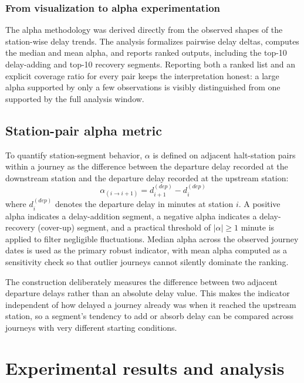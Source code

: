 \documentclass[a4paper,fleqn]{cas-dc}
\begin{document}
\subsubsection{From visualization to alpha experimentation}
The alpha methodology was derived directly from the observed shapes of the
station-wise delay trends. The analysis formalizes pairwise delay deltas,
computes the median and mean alpha, and reports ranked outputs, including the
top-10 delay-adding and top-10 recovery segments. Reporting both a ranked list
and an explicit coverage ratio for every pair keeps the interpretation
honest: a large alpha supported by only a few observations is visibly
distinguished from one supported by the full analysis window.

\subsection{Station-pair alpha metric}
To quantify station-segment behavior, $\alpha$ is defined on adjacent
halt-station pairs within a journey as the difference between the departure
delay recorded at the downstream station and the departure delay recorded at
the upstream station:
\begin{equation}
\alpha_{(i \rightarrow i+1)} = d_{i+1}^{(dep)} - d_i^{(dep)}
\label{eq:alpha}
\end{equation}
where $d_i^{(dep)}$ denotes the departure delay in minutes at station $i$. A
positive alpha indicates a delay-addition segment, a negative alpha indicates
a delay-recovery (cover-up) segment, and a practical threshold of
$|\alpha| \geq 1$ minute is applied to filter negligible fluctuations. Median
alpha across the observed journey dates is used as the primary robust
indicator, with mean alpha computed as a sensitivity check so that outlier
journeys cannot silently dominate the ranking.

The construction deliberately measures the difference between two adjacent
departure delays rather than an absolute delay value. This makes the
indicator independent of how delayed a journey already was when it reached the
upstream station, so a segment's tendency to add or absorb delay can be
compared across journeys with very different starting conditions.

\section{Experimental results and analysis}
\label{sec:results}
\end{document}
